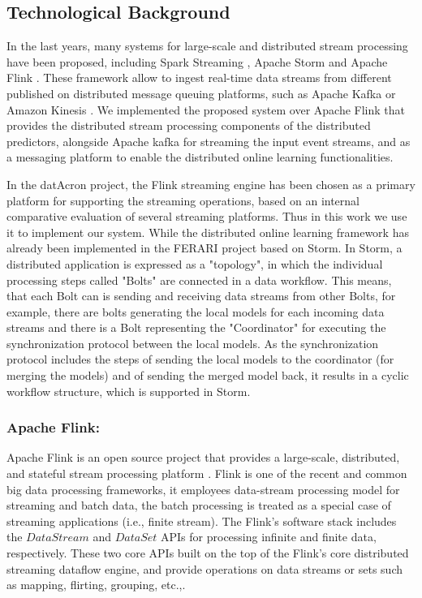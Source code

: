 \subsection{Technological Background}
In the last years, many systems for large-scale and distributed stream processing have been proposed, including Spark Streaming \cite{Spark},  Apache Storm \cite{Storm} and Apache Flink \cite{Flink}. These framework allow to ingest real-time data streams from different published on distributed message queuing platforms, such as Apache Kafka \cite{Kafka} or  Amazon Kinesis \cite{Kinesis}. We implemented the proposed system over Apache Flink that provides the distributed stream processing components of the distributed predictors, alongside  Apache kafka for streaming the input event streams, and as a messaging platform to enable the distributed online learning functionalities.


\par In the datAcron project, the Flink streaming engine has been chosen as a primary platform for supporting the streaming operations, based on an internal comparative evaluation of several streaming platforms. Thus in this work we use it to implement our system. While the distributed online learning framework has already been implemented in the FERARI project \cite{flouris2016ferari}  based on Storm. In Storm, a distributed application is expressed as a "topology", in which the individual processing steps called "Bolts" are connected
in a data workflow. This means, that each Bolt can is sending and receiving data streams from other Bolts, for example, there are bolts generating
the local models for each incoming data streams and there is a Bolt representing the "Coordinator" for executing the synchronization protocol between
the local models. As the synchronization protocol includes the steps of sending the local models to the coordinator (for merging the models) and of sending
the merged model back, it results in a cyclic workflow structure, which is supported in Storm. 

\subsubsection*{Apache Flink:\\}

\par Apache Flink is an open source project that provides a large-scale, distributed,  and stateful stream processing platform \cite{carbone2015apache}. Flink is one of the recent and common big data processing frameworks, it employees data-stream processing model for streaming and batch data, the batch processing is treated as a special case of streaming applications (i.e., finite stream). The Flink's software stack includes the  $DataStream$ and $DataSet$ APIs for processing infinite and finite data, respectively. These two core APIs built on the top of the Flink's core distributed streaming dataflow engine, and provide operations on data streams or sets such as mapping, flirting, grouping, etc.,.  

